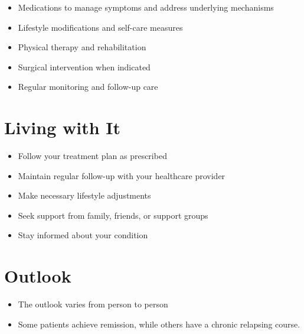 \begin{itemize}[noitemsep]
  \item Medications to manage symptoms and address underlying mechanisms
  \item Lifestyle modifications and self-care measures
  \item Physical therapy and rehabilitation
  \item Surgical intervention when indicated
  \item Regular monitoring and follow-up care
\end{itemize}
\section{Living with It}
\begin{itemize}[noitemsep]
  \item Follow your treatment plan as prescribed
  \item Maintain regular follow-up with your healthcare provider
  \item Make necessary lifestyle adjustments
  \item Seek support from family, friends, or support groups
  \item Stay informed about your condition
\end{itemize}
\section{Outlook}
\begin{itemize}[noitemsep]
  \item The outlook varies from person to person
  \item Some patients achieve remission, while others have a chronic relapsing course.
\end{itemize}
